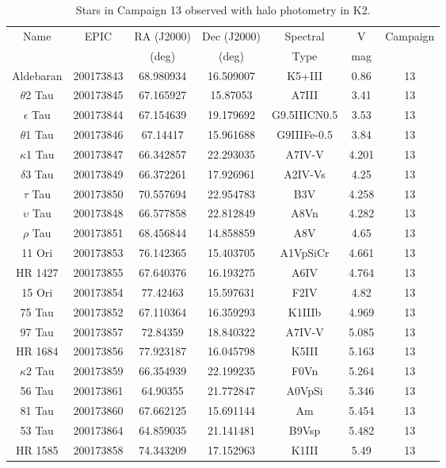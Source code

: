 \begin{table*}
\caption{Stars in Campaign 13 observed with halo photometry in K2.\label{table_3}}
\begin{tabular}{ccccccc}
\hline \hline
Name & EPIC & RA (J2000) & Dec (J2000) & Spectral & V & Campaign \\
 &  & (deg) & (deg) & Type & mag &  \\
\hline
Aldebaran & 200173843 & 68.980934 & 16.509007 & K5+III & 0.86 & 13 \\
$\theta$2 Tau & 200173845 & 67.165927 & 15.87053 & A7III & 3.41 & 13 \\
$\epsilon$ Tau & 200173844 & 67.154639 & 19.179692 & G9.5IIICN0.5 & 3.53 & 13 \\
$\theta$1 Tau & 200173846 & 67.14417 & 15.961688 & G9IIIFe-0.5 & 3.84 & 13 \\
$\kappa$1 Tau & 200173847 & 66.342857 & 22.293035 & A7IV-V & 4.201 & 13 \\
$\delta$3 Tau & 200173849 & 66.372261 & 17.926961 & A2IV-Vs & 4.25 & 13 \\
$\tau$ Tau & 200173850 & 70.557694 & 22.954783 & B3V & 4.258 & 13 \\
$\upsilon$ Tau & 200173848 & 66.577858 & 22.812849 & A8Vn & 4.282 & 13 \\
$\rho$ Tau & 200173851 & 68.456844 & 14.858859 & A8V & 4.65 & 13 \\
11 Ori & 200173853 & 76.142365 & 15.403705 & A1VpSiCr & 4.661 & 13 \\
HR 1427 & 200173855 & 67.640376 & 16.193275 & A6IV & 4.764 & 13 \\
15 Ori & 200173854 & 77.42463 & 15.597631 & F2IV & 4.82 & 13 \\
75 Tau & 200173852 & 67.110364 & 16.359293 & K1IIIb & 4.969 & 13 \\
97 Tau & 200173857 & 72.84359 & 18.840322 & A7IV-V & 5.085 & 13 \\
HR 1684 & 200173856 & 77.923187 & 16.045798 & K5III & 5.163 & 13 \\
$\kappa$2 Tau & 200173859 & 66.354939 & 22.199235 & F0Vn & 5.264 & 13 \\
56 Tau & 200173861 & 64.90355 & 21.772847 & A0VpSi & 5.346 & 13 \\
81 Tau & 200173860 & 67.662125 & 15.691144 & Am & 5.454 & 13 \\
53 Tau & 200173864 & 64.859035 & 21.141481 & B9Vsp & 5.482 & 13 \\
HR 1585 & 200173858 & 74.343209 & 17.152963 & K1III & 5.49 & 13 \\

\end{tabular}
\end{table*}
